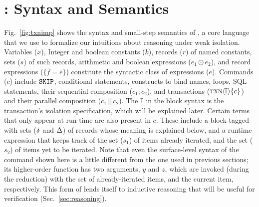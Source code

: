 \section{\txnimp: Syntax and Semantics}
\label{sec:opsem}

\label{sec:syntax}



Fig.~\ref{fig:txnimp} shows the syntax and small-step semantics of
\txnimp, a core language that we use to formalize our intuitions about
reasoning under weak isolation. Variables ($x$), Integer and boolean
constants ($k$), records ($r$) of named constants, sets ($s$) of such
records, arithmetic and boolean expressions ($e_1 \odot e_2$), and
record expressions ($\{\bar{f}=\bar{e}\}$) constitute the syntactic
class of expressions ($e$). Commands ($c$) include $\cskip$,
conditional statements,  constructs to bind names, 
loops, SQL statements, their sequential composition ($c_1;c_2$), and
transactions ($\ctxn{i}{\I}{c}$) and their parallel composition
($c_1\,||\,c_2$). The $\I$ in the  block syntax is the
transaction's isolation specification, which will be explained later.
Certain terms that only appear at run-time are also present in $c$.
These include a  block tagged with sets ($\stl$ and $\stg$) of
records whose meaning is explained below, and a runtime 
expression that keeps track of the set ($s_1$) of items already
iterated, and the set ($s_2$) of items yet to be iterated. Note that
even the surface-level syntax of the  command shown here is
a little different from the one used in previous sections; its
higher-order function has two arguments, $y$ and $z$, which are
invoked (during the reduction) with the set of already-iterated items,
and the current item, respectively. This form of  lends
itself to inductive reasoning that will be useful for verification
(Sec.~\ref{sec:reasoning}).


